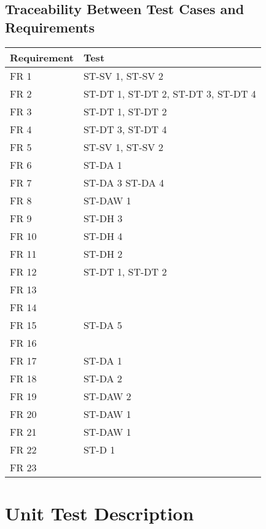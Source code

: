 \documentclass[12pt, titlepage]{article}
\begin{document}
\subsection{Traceability Between Test Cases and Requirements}
\begin{tabular}{| p{} | p{}|}
  \hline
  \rowcolor[gray]{0.9}
  Requirement & Test \\
  \hline
  FR 1 & ST-SV 1, ST-SV 2 \\
  \hline
  FR 2 & ST-DT 1, ST-DT 2, ST-DT 3, ST-DT 4 \\
  \hline
  FR 3 & ST-DT 1, ST-DT 2 \\
  \hline
  FR 4 & ST-DT 3, ST-DT 4 \\
  \hline
  FR 5 & ST-SV 1, ST-SV 2 \\
  \hline
  FR 6 & ST-DA 1 \\
  \hline
  FR 7 & ST-DA 3 ST-DA 4 \\
  \hline
  FR 8 & ST-DAW 1 \\
  \hline
  FR 9 & ST-DH 3 \\
  \hline
  FR 10 & ST-DH 4 \\
  \hline
  FR 11 & ST-DH 2 \\
  \hline
  FR 12 & ST-DT 1, ST-DT 2 \\
  \hline
  FR 13 &  \\
  \hline
  FR 14 &  \\
  \hline
  FR 15 & ST-DA 5\\
  \hline
  FR 16 &  \\
  \hline
  FR 17 & ST-DA 1 \\
  \hline
  FR 18 & ST-DA 2 \\
  \hline
  FR 19 & ST-DAW 2 \\
  \hline
  FR 20 & ST-DAW 1 \\
  \hline
  FR 21 & ST-DAW 1 \\
  \hline
  FR 22 & ST-D 1 \\
  \hline
  FR 23 &  \\
  \hline
  
\end{tabular}


\section{Unit Test Description}

\end{document}
